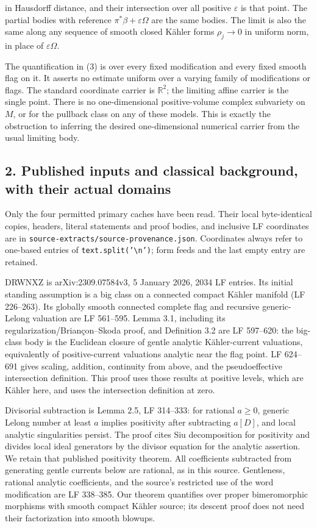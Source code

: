 \documentclass[11pt]{article}
\begin{document}
in Hausdorff distance, and their intersection over all positive $\varepsilon$ is that point. The partial bodies with reference $\pi^*\beta+\varepsilon\Omega$ are the same bodies. The limit is also the same along any sequence of smooth closed Kähler forms $\rho_j\to0$ in uniform norm, in place of $\varepsilon\Omega$.

The quantification in (3) is over every fixed modification and every fixed smooth flag on it. It asserts no estimate uniform over a varying family of modifications or flags. The standard coordinate carrier is $\mathbb R^2$; the limiting affine carrier is the single point. There is no one-\allowbreak{}dimensional positive-\allowbreak{}volume complex subvariety on $M$, or for the pullback class on any of these models. This is exactly the obstruction to inferring the desired one-\allowbreak{}dimensional numerical carrier from the usual limiting body.

\subsection{2. Published inputs and classical background, with their actual domains}

Only the four permitted primary caches have been read. Their local byte-\allowbreak{}identical copies, headers, literal statements and proof bodies, and inclusive LF coordinates are in \texttt{source-\allowbreak{}extracts/\allowbreak{}source-\allowbreak{}provenance.json}. Coordinates always refer to one-\allowbreak{}based entries of \texttt{text.split('\textbackslash{}n')}; form feeds and the last empty entry are retained.

DRWNXZ is arXiv:2309.07584v3, 5 January 2026, 2034 LF entries. Its initial standing assumption is a big class on a connected compact Kähler manifold (LF 226–263). Its globally smooth connected complete flag and recursive generic-\allowbreak{}Lelong valuation are LF 561–595. Lemma 3.1, including its regularization/\allowbreak{}Briançon–Skoda proof, and Definition 3.2 are LF 597–620: the big-\allowbreak{}class body is the Euclidean closure of gentle analytic Kähler-\allowbreak{}current valuations, equivalently of positive-\allowbreak{}current valuations analytic near the flag point. LF 624–691 gives scaling, addition, continuity from above, and the pseudoeffective intersection definition. This proof uses those results at positive levels, which are Kähler here, and uses the intersection definition at zero.

Divisorial subtraction is Lemma 2.5, LF 314–333: for rational $a\geq0$, generic Lelong number at least $a$ implies positivity after subtracting $a[D]$, and local analytic singularities persist. The proof cites Siu decomposition for positivity and divides local ideal generators by the divisor equation for the analytic assertion. We retain that published positivity theorem. All coefficients subtracted from generating gentle currents below are rational, as in this source. Gentleness, rational analytic coefficients, and the source's restricted use of the word modification are LF 338–385. Our theorem quantifies over proper bimeromorphic morphisms with smooth compact Kähler source; its descent proof does not need their factorization into smooth blowups.
\end{document}
